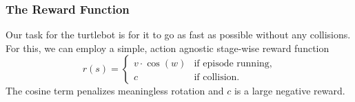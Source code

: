 \documentclass{article}
\begin{document}
\subsubsection{The Reward Function}
Our task for the turtlebot is for it to go as fast as possible without any collisions. For this, we can employ a simple, action agnostic stage-wise reward function
\begin{equation*}
  r(s) =
  \begin{cases}
    v \cdot \cos(w) & \text{if episode running,} \\
    c & \text{if collision.}
  \end{cases}
\end{equation*}
The cosine term penalizes meaningless rotation and $c$ is a large negative reward.



%
%
\end{document}
